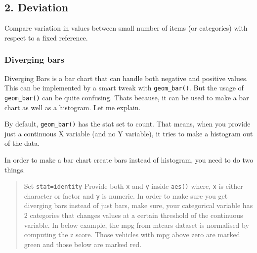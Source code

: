 \documentclass[a4paper]{article}
\begin{document}
\subsection{2. Deviation}\label{deviation}

Compare variation in values between small number of items (or
categories) with respect to a fixed reference.

\subsubsection{Diverging bars}\label{diverging-bars}

Diverging Bars is a bar chart that can handle both negative and positive
values. This can be implemented by a smart tweak with
\texttt{geom\_bar()}. But the usage of \texttt{geom\_bar()} can be quite
confusing. Thats because, it can be used to make a bar chart as well as
a histogram. Let me explain.

By default, \texttt{geom\_bar()} has the stat set to count. That means,
when you provide just a continuous X variable (and no Y variable), it
tries to make a histogram out of the data.

In order to make a bar chart create bars instead of histogram, you need
to do two things.

\begin{quote}
Set \texttt{stat=identity} Provide both \texttt{x} and \texttt{y} inside
\texttt{aes()} where, \texttt{x} is either character or factor and
\texttt{y} is numeric. In order to make sure you get diverging bars
instead of just bars, make sure, your categorical variable has 2
categories that changes values at a certain threshold of the continuous
variable. In below example, the mpg from mtcars dataset is normalised by
computing the z score. Those vehicles with mpg above zero are marked
green and those below are marked red.
\end{quote}
\end{document}
